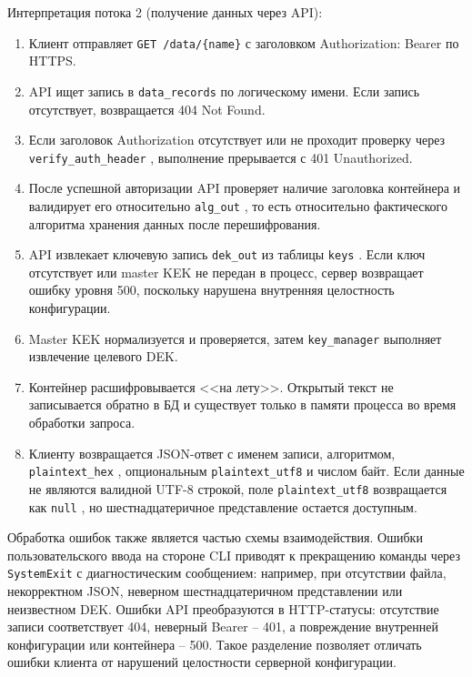 \documentclass[14pt, a4paper]{extarticle}
\renewcommand{\texttt}[1]{%
  {\def\UrlFont{\ttfamily}\nolinkurl{#1}}%
}
\begin{document}
	Интерпретация потока 2 (получение данных через API):
	
	\begin{enumerate}
	    \item Клиент отправляет \texttt{GET /data/\{name\}} с заголовком Authorization: Bearer по HTTPS.
	    \item API ищет запись в \texttt{data\_records} по логическому имени. Если запись отсутствует, возвращается 404 Not Found.
	    \item Если заголовок Authorization отсутствует или не проходит проверку через \texttt{verify\_auth\_header}, выполнение прерывается с 401 Unauthorized.
	    \item После успешной авторизации API проверяет наличие заголовка контейнера и валидирует его относительно \texttt{alg\_out}, то есть относительно фактического алгоритма хранения данных после перешифрования.
	    \item API извлекает ключевую запись \texttt{dek\_out} из таблицы \texttt{keys}. Если ключ отсутствует или master KEK не передан в процесс, сервер возвращает ошибку уровня 500, поскольку нарушена внутренняя целостность конфигурации.
	    \item Master KEK нормализуется и проверяется, затем \texttt{key\_manager} выполняет извлечение целевого DEK.
	    \item Контейнер расшифровывается <<на лету>>. Открытый текст не записывается обратно в БД и существует только в памяти процесса во время обработки запроса.
	    \item Клиенту возвращается JSON-ответ с именем записи, алгоритмом, \texttt{plaintext\_hex}, опциональным \texttt{plaintext\_utf8} и числом байт. Если данные не являются валидной UTF-8 строкой, поле \texttt{plaintext\_utf8} возвращается как \texttt{null}, но шестнадцатеричное представление остается доступным.
	\end{enumerate}

	Обработка ошибок также является частью схемы взаимодействия. Ошибки пользовательского ввода на стороне CLI приводят к прекращению команды через \texttt{SystemExit} с диагностическим сообщением: например, при отсутствии файла, некорректном JSON, неверном шестнадцатеричном представлении или неизвестном DEK. Ошибки API преобразуются в HTTP-статусы: отсутствие записи соответствует 404, неверный Bearer -- 401, а повреждение внутренней конфигурации или контейнера -- 500. Такое разделение позволяет отличать ошибки клиента от нарушений целостности серверной конфигурации.
	
\end{document}
